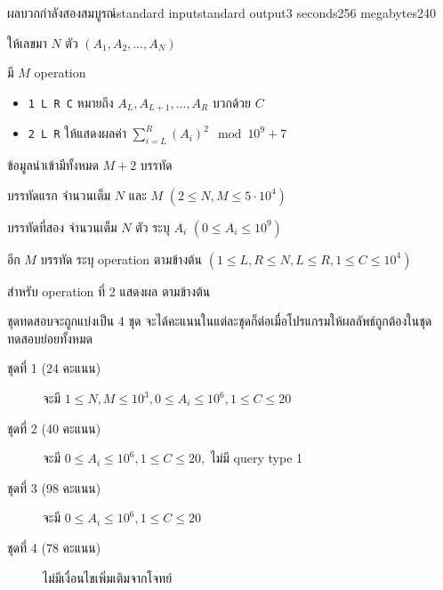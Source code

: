 \documentclass[11pt,a4paper]{article}
\begin{document}
\begin{problem}{ผลบวกกำลังสองสมบูรณ์}{standard input}{standard output}{3 seconds}{256 megabytes}{240}

ให้เลขมา $N$ ตัว $(A_1, A_2, \dots, A_N)$ 

มี $M$ operation
\begin{itemize}

\item \texttt{1 L R C} หมายถึง $A_L, A_{L+1},...,A_R$ บวกด้วย $C$

\item \texttt{2 L R} ให้แสดงผลค่า $\displaystyle\sum_{i=L}^{R} (A_i)^2 \mod 10^9+7$

\end{itemize}

\InputFile
ข้อมูลนำเข้ามีทั้งหมด $M+2$ บรรทัด

บรรทัดแรก จำนวนเต็ม $N$ และ $M$ $(2 \le N, M \le 5 \cdot 10^4)$

บรรทัดที่สอง จำนวนเต็ม $N$ ตัว ระบุ $A_i$ $(0 \le A_i \le 10^9)$ 

อีก $M$ บรรทัด ระบุ operation ตามข้างต้น $(1 \le L, R \le N, L \le R,
1 \le C \le 10^4)$

\OutputFile
สำหรับ operation ที่ 2 แสดงผล ตามข้างต้น

\Scoring
ชุดทดสอบจะถูกแบ่งเป็น 4 ชุด จะได้คะแนนในแต่ละชุดก็ต่อเมื่อโปรแกรมให้ผลลัพธ์ถูกต้องในชุดทดสอบย่อยทั้งหมด

\begin{description}

\item[ชุดที่ 1  (24 คะแนน)] จะมี $1 \leq N, M \leq 10^3,0 \leq A_i \leq 10^6, 1 \leq C \leq 20$

\item[ชุดที่ 2 (40 คะแนน)] จะมี $0 \leq A_i \leq 10^6, 1 \leq C \leq 20,$ ไม่มี query type 1

\item[ชุดที่ 3 (98 คะแนน)] จะมี $0 \leq A_i \leq 10^6, 1 \leq C \leq 20$

\item[ชุดที่ 4 (78 คะแนน)] ไม่มีเงื่อนไขเพิ่มเติมจากโจทย์

\end{description}

\Examples

\begin{example}
%
%
%
\end{example}

\end{problem}
\end{document}
